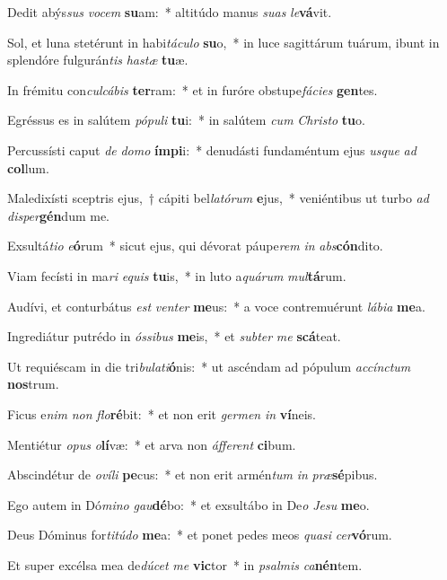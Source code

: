 \item Dedit abýs\textit{sus} \textit{vo}\textit{cem} \textbf{su}am:~* altitúdo manus \textit{su}\textit{as} \textit{le}\textbf{vá}vit.
\item Sol, et luna stetérunt in habi\textit{tá}\textit{cu}\textit{lo} \textbf{su}o,~* in luce sagittárum tuárum, ibunt in splendóre fulgurán\textit{tis} \textit{has}\textit{tæ} \textbf{tu}æ.
\item In frémitu con\textit{cul}\textit{cá}\textit{bis} \textbf{ter}ram:~* et in furóre obstupe\textit{fá}\textit{ci}\textit{es} \textbf{gen}tes.
\item Egréssus es in salútem \textit{pó}\textit{pu}\textit{li} \textbf{tu}i:~* in salútem \textit{cum} \textit{Chris}\textit{to} \textbf{tu}o.
\item Percussísti caput \textit{de} \textit{do}\textit{mo} \textbf{ím}\textbf{pi}i:~* denudásti fundaméntum ejus \textit{us}\textit{que} \textit{ad} \textbf{col}lum.
\item Maledixísti sceptris ejus,~† cápiti bel\textit{la}\textit{tó}\textit{rum} \textbf{e}jus,~* veniéntibus ut turbo \textit{ad} \textit{di}\textit{sper}\textbf{gén}dum me.
\item Exsultá\textit{ti}\textit{o} \textit{e}\textbf{ó}rum~* sicut ejus, qui dévorat páupe\textit{rem} \textit{in} \textit{abs}\textbf{cón}dito.
\item Viam fecísti in ma\textit{ri} \textit{e}\textit{quis} \textbf{tu}is,~* in luto a\textit{quá}\textit{rum} \textit{mul}\textbf{tá}rum.
\item Audívi, et conturbátus \textit{est} \textit{ven}\textit{ter} \textbf{me}us:~* a voce contremuérunt \textit{lá}\textit{bi}\textit{a} \textbf{me}a.
\item Ingrediátur putrédo in \textit{ós}\textit{si}\textit{bus} \textbf{me}is,~* et \textit{sub}\textit{ter} \textit{me} \textbf{scá}teat.
\item Ut requiéscam in die tri\textit{bu}\textit{la}\textit{ti}\textbf{ó}nis:~* ut ascéndam ad pópulum \textit{ac}\textit{cínc}\textit{tum} \textbf{nos}trum.
\item Ficus e\textit{nim} \textit{non} \textit{flo}\textbf{ré}bit:~* et non erit \textit{ger}\textit{men} \textit{in} \textbf{ví}neis.
\item Mentiétur \textit{o}\textit{pus} \textit{o}\textbf{lí}væ:~* et arva non \textit{áf}\textit{fe}\textit{rent} \textbf{ci}bum.
\item Abscindétur de \textit{o}\textit{ví}\textit{li} \textbf{pe}cus:~* et non erit armén\textit{tum} \textit{in} \textit{præ}\textbf{sé}pibus.
\item Ego autem in Dó\textit{mi}\textit{no} \textit{gau}\textbf{dé}bo:~* et exsultábo in De\textit{o} \textit{Je}\textit{su} \textbf{me}o.
\item Deus Dóminus for\textit{ti}\textit{tú}\textit{do} \textbf{me}a:~* et ponet pedes meos \textit{qua}\textit{si} \textit{cer}\textbf{vó}rum.
\item Et super excélsa mea de\textit{dú}\textit{cet} \textit{me} \textbf{vic}tor~* in \textit{psal}\textit{mis} \textit{ca}\textbf{nén}tem.

